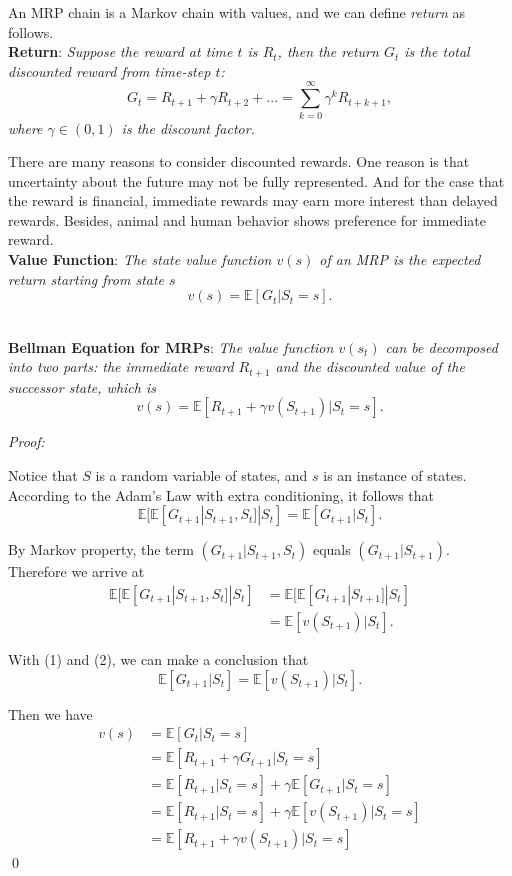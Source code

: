 \documentclass{progartcn}
\begin{document}
		An MRP chain is a Markov chain with values, and we can define \textit{return} as follows.\\

		\textbf{Return}: \textit{Suppose the reward at time $t$ is $R_t$, then the return $G_t$ is the total discounted reward from time-step $t$:}
		\[G_t=R_{t+1}+\gamma R_{t+2}+...=\sum_{k=0}^\infty \gamma^kR_{t+k+1},\]
		\textit{where $\gamma\in(0,1)$ is the discount factor.}

		There are many reasons to consider discounted rewards. One reason is that uncertainty about the future may not be fully represented. And for the case that the reward is financial, immediate rewards may earn more interest than delayed rewards. Besides, animal and human behavior shows preference for immediate reward.\\

		\textbf{Value Function}: \textit{The state value function $v(s)$ of an MRP is the expected return starting from state $s$}
		\[v(s)=\mathbb{E}[G_t|S_t=s].\]\

		\textbf{Bellman Equation for MRPs}: \textit{The value function $v(s_t)$ can be decomposed into two parts: the immediate reward $R_{t+1}$ and the discounted value of the successor state, which is}
		\[v(s)=\mathbb{E}[R_{t+1}+\gamma v(S_{t+1})|S_t=s].\]

		\textit{Proof:} 

		Notice that $S$ is a random variable of states, and $s$ is an instance of states. According to the Adam's Law with extra conditioning, it follows that 
		\[\mathbb{E}[\mathbb{E}[G_{t+1}|S_{t+1},S_t]|S_t]=\mathbb{E}[G_{t+1}|S_t].\tag{1}\]

		By Markov property, the term $(G_{t+1}|S_{t+1},S_t)$ equals $(G_{t+1}|S_{t+1})$. Therefore we arrive at
		\begin{align*}
		\mathbb{E}[\mathbb{E}[G_{t+1}|S_{t+1},S_t]|S_t]&=\mathbb{E}[\mathbb{E}[G_{t+1}|S_{t+1}]|S_t]\\
		&=\mathbb{E}[v(S_{t+1})|S_t].\tag{2}
		\end{align*}

		With (1) and (2), we can make a conclusion that
		\[\mathbb{E}[G_{t+1}|S_t]=\mathbb{E}[v(S_{t+1})|S_t].\tag{3}\]

		Then we have
		\begin{align*}
		v(s) &=\mathbb{E}[G_t|S_t=s]\\
		&=\mathbb{E}[R_{t+1}+\gamma G_{t+1}|S_t=s]\\
		&=\mathbb{E}[R_{t+1}|S_t=s]+\gamma \mathbb{E}[G_{t+1}|S_t=s]\\
		&=\mathbb{E}[R_{t+1}|S_t=s]+\gamma \mathbb{E}[v(S_{t+1})|S_t=s]\tag{by (3)}\\
		&=\mathbb{E}[R_{t+1}+\gamma v(S_{t+1})|S_t=s]
		\end{align*}
		\qed
\end{document}
